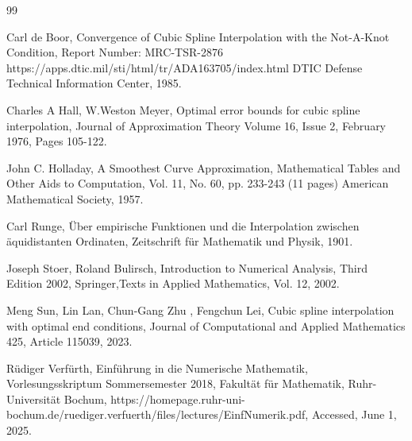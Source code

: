 \documentclass[12pt]{article}
\begin{document}
\vfill




\begin{thebibliography}{99}

 

  
Carl de Boor,    
Convergence of Cubic Spline Interpolation with the Not-A-Knot Condition,
Report Number: MRC-TSR-2876
https://apps.dtic.mil/sti/html/tr/ADA163705/index.html
DTIC Defense Technical Information Center, 1985.


Charles A Hall, W.Weston Meyer,
Optimal error bounds for cubic spline interpolation,
Journal of Approximation Theory
Volume 16, Issue 2, February 1976, Pages 105-122.


John C. Holladay,
A Smoothest Curve Approximation,
Mathematical Tables and Other Aids to Computation,
Vol. 11, No. 60, pp. 233-243 (11 pages)
American Mathematical Society, 1957.



Carl Runge,
Über empirische Funktionen und die Interpolation zwischen
äquidistanten Ordinaten,
Zeitschrift für Mathematik und Physik, 1901.


Joseph Stoer, Roland Bulirsch,
Introduction to Numerical Analysis, 
Third Edition 2002,
Springer,Texts in Applied Mathematics, Vol. 12, 2002.


Meng Sun, Lin Lan, Chun-Gang Zhu , Fengchun Lei,
Cubic spline interpolation with optimal end conditions,
Journal of Computational and Applied Mathematics 425,
Article 115039, 2023.


  Rüdiger Verfürth,
  Einführung in die Numerische Mathematik,
  Vorlesungsskriptum Sommersemester 2018,
  Fakultät für Mathematik, Ruhr-Universität Bochum,
  https://homepage.ruhr-uni-bochum.de/ruediger.verfuerth/files/lectures/EinfNumerik.pdf,
  Accessed, June 1, 2025.
  

\end{thebibliography}
\end{document}
